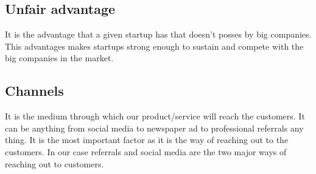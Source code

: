 \documentclass[a4paper, 12pt]{report}
\begin{document}
\subsection[short]{Unfair advantage}
It is the advantage that a given startup has that doesn't posses by big companies. This advantages makes startups strong enough to sustain and
compete with the big companies in the market.

\subsection[short]{Channels}
It is the medium through which our product/service will reach the customers. It can be anything from social media to newspaper ad to professional
referrals any thing. It is the most important factor as it is the way of reaching out to the customers. In our case referrals and social media 
are the two major ways of reaching out to customers.
\end{document}
